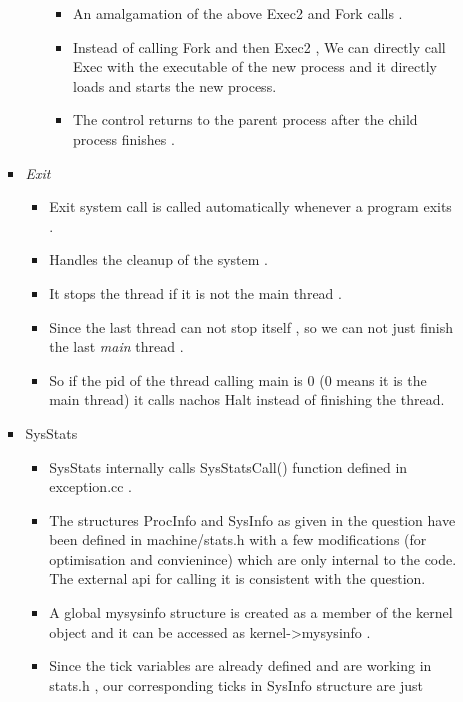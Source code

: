 \documentclass{article}
\begin{document}
\begin{itemize}
\begin{itemize}
\begin{itemize}
\begin{itemize}
        \begin{itemize}
        \item
          An amalgamation of the above Exec2 and Fork calls .
        \item
          Instead of calling Fork and then Exec2 , We can directly call
          Exec with the executable of the new process and it directly
          loads and starts the new process.
        \item
          The control returns to the parent process after the child
          process finishes .
        \end{itemize}
      \end{itemize}
    \item
      \emph{Exit}

      \begin{itemize}
      \item
        Exit system call is called automatically whenever a program
        exits .
      \item
        Handles the cleanup of the system .
      \item
        It stops the thread if it is not the main thread .
      \item
        Since the last thread can not stop itself , so we can not just
        finish the last \emph{main} thread .
      \item
        So if the pid of the thread calling main is 0 (0 means it is the
        main thread) it calls nachos Halt instead of finishing the
        thread.
      \end{itemize}
    \item
      SysStats
      \begin{itemize}
      \item
        SysStats internally calls SysStatsCall() function defined in
        exception.cc .
      \item
        The structures ProcInfo and SysInfo as given in the question
        have been defined in machine/stats.h with a few modifications
        (for optimisation and convienince) which are only internal to
        the code. The external api for calling it is consistent with the
        question.
      \item
        A global mysysinfo structure is created as a member of the
        kernel object and it can be accessed as
        kernel-\textgreater{}mysysinfo .
      \item
        Since the tick variables are already defined and are working in
        stats.h , our corresponding ticks in SysInfo structure are just

\end{itemize}
\end{itemize}
\end{itemize}
\end{itemize}
\end{document}
